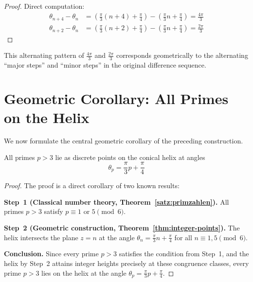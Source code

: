 \begin{proof}
Direct computation:
\begin{align}
\theta_{n+4} - \theta_n &= \left(\frac{\pi}{3}(n+4) + \frac{\pi}{4}\right) - \left(\frac{\pi}{3}n + \frac{\pi}{4}\right) = \frac{4\pi}{3}\\
\theta_{n+2} - \theta_n &= \left(\frac{\pi}{3}(n+2) + \frac{\pi}{4}\right) - \left(\frac{\pi}{3}n + \frac{\pi}{4}\right) = \frac{2\pi}{3}
\end{align}
\end{proof}

\begin{remark}\label{rem:alternating-pattern}
This alternating pattern of $\frac{4\pi}{3}$ and $\frac{2\pi}{3}$
corresponds geometrically to the alternating ``major steps'' and ``minor
steps'' in the original difference sequence.
\end{remark}

\section{Geometric Corollary: All Primes on the Helix}

We now formulate the central geometric corollary of the preceding
construction.

\begin{theorem}\label{thm:primes-on-helix}
All primes $p > 3$ lie as discrete points on the conical helix at angles
\begin{equation}\label{eq:prime-angles}
\boxed{\theta_p = \frac{\pi}{3}p + \frac{\pi}{4}}
\end{equation}
\end{theorem}

\begin{proof}
The proof is a direct corollary of two known results:

\textbf{Step~1 (Classical number theory, Theorem~\ref{satz:primzahlen}).}
All primes $p > 3$ satisfy $p \equiv 1$ or $5 \pmod{6}$.

\textbf{Step~2 (Geometric construction, Theorem~\ref{thm:integer-points}).}
The helix intersects the plane $z = n$ at the angle
$\theta_n = \frac{\pi}{3}n + \frac{\pi}{4}$ for all
$n \equiv 1, 5 \pmod{6}$.

\textbf{Conclusion.} Since every prime $p > 3$ satisfies the condition
from Step~1, and the helix by Step~2 attains integer heights precisely at
these congruence classes, every prime $p > 3$ lies on the helix at the
angle $\theta_p = \frac{\pi}{3}p + \frac{\pi}{4}$.
\end{proof}

